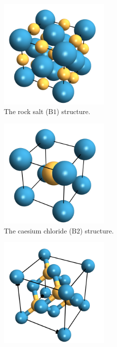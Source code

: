 \documentclass[fleqn]{NotesClass}
\begin{document}
    \begin{figure}
        \begin{subfigure}{0.6\textwidth}
            \centering
            \includegraphics[width=0.6\textwidth]{images/rocksalt.pdf}
            \caption{The rock salt (\(\mathrm{B1}\)) structure.}
        \end{subfigure}
        \begin{subfigure}{0.6\textwidth}
            \centering
            \includegraphics[width=0.6\textwidth]{images/CsCl.pdf}
            \caption{The caesium chloride (\(\mathrm{B2}\)) structure.}
        \end{subfigure}
        \begin{subfigure}{0.6\textwidth}
            \centering
            \includegraphics[width=0.6\textwidth]{images/ZnS1.pdf}

\end{subfigure}
\end{figure}
\end{document}
